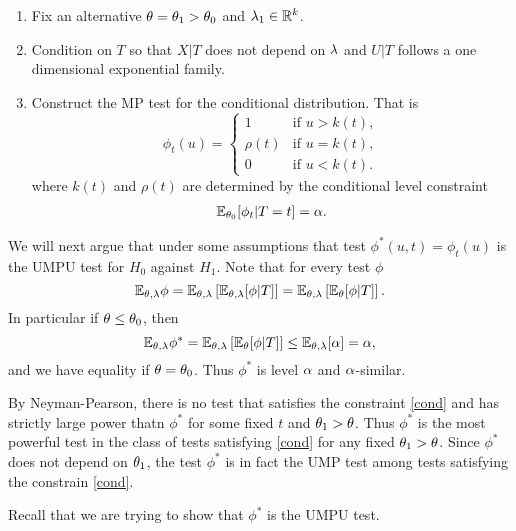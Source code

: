 \renewcommand\labelenumi{(\theenumi)}
\begin{enumerate}
    \item Fix an alternative ${\theta} = {\theta}_1 > {\theta}_0$ and $\lambda_1 \in {\mathbb R}^k$.
    \item Condition on $T$ so that $X|T$ does not depend on $\lambda$ and $U|T$ follows a one dimensional exponential family. 
    \item Construct the MP test for the conditional distribution. That is
    \[\phi_t(u) = \begin{cases}
        1 & \text{if } u > k(t),\\
        \rho(t) & \text{if } u = k(t),\\
        0 & \text{if } u < k(t).
    \end{cases}\]
    where $k(t)$ and $\rho(t)$ are determined by the conditional level constraint
    \begin{align}\label{cond}
        {\mathbb{E}}_{{\theta}_0}[\phi_t | T=t] = {\alpha}.
    \end{align}
\end{enumerate}
We will next argue that under some assumptions that test $\phi^*(u,t) = \phi_t(u)$ is the UMPU test for $H_0$ against $H_1$. Note that for every test $\phi$
\[{\mathbb{E}}_{{\theta},\lambda} \phi = {\mathbb{E}}_{{\theta},\lambda}\left[{\mathbb{E}}_{{\theta},\lambda}[\phi|T]\right] = {\mathbb{E}}_{{\theta},\lambda}\left[{\mathbb{E}}_{{\theta}}[\phi|T]\right]. \]
In particular if ${\theta} \le {\theta}_0$, then 
\[{\mathbb{E}}_{{\theta},\lambda} \phi^* = {\mathbb{E}}_{{\theta},\lambda}\left[{\mathbb{E}}_{\theta}[\phi|T]\right]\le {\mathbb{E}}_{{\theta},\lambda}[{\alpha}]={\alpha}, \]
and we have equality if ${\theta} = {\theta}_0$. Thus $\phi^*$ is level ${\alpha}$ and ${\alpha}$-similar.

By Neyman-Pearson, there is no test that satisfies the constraint \eqref{cond} and has strictly large power thatn $\phi^*$ for some fixed $t$ and ${\theta}_1 > {\theta}$. Thus $\phi^*$ is the most powerful test in the class of tests satisfying \eqref{cond} for any fixed ${\theta}_1 > {\theta}$. Since $\phi^*$ does not depend on ${\theta}_1$, the test $\phi^*$ is in fact the UMP test among tests satisfying the constrain \eqref{cond}.

Recall that we are trying to show that $\phi^*$ is the UMPU test. 
